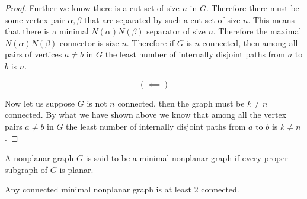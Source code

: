 \documentclass{article}
\begin{document}
\begin{proof}
	Further we know there is a cut set of size $n$ in $G$. Therefore there must be some vertex pair $\alpha, \beta$ that are separated by such a cut set of size $n$. This means that there is a minimal $N(\alpha)N(\beta)$ separator of size $n$. Therefore the maximal $N(\alpha)N(\beta)$ connector is size $n$. Therefore if $G$ is $n$ connected, then among all pairs of vertices $a\not=b$ in $G$ the least number of internally disjoint paths from $a$ to $b$ is $n$.
	
	$$(\impliedby)$$
	
	Now let us suppose $G$ is not $n$ connected, then the graph must be $k\not= n$ connected. By what we have shown above we know that among all the vertex pairs $a\not= b$ in $G$ the least number of internally disjoint paths from $a$ to $b$ is $k\not=n$.
\end{proof}


\begin{definition}
	A nonplanar graph $G$ is said to be a minimal nonplanar graph if every proper subgraph of $G$ is planar.
\end{definition}


\begin{lemma}\label{2connect}
	Any connected minimal nonplanar graph is at least 2 connected.
\end{lemma}
\end{document}
